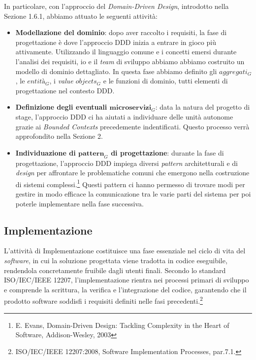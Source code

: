         \noindent In particolare, con l'approccio del \textit{Domain-Driven Design}, introdotto nella Sezione 1.6.1, abbiamo attuato le seguenti attività:
        \begin{itemize}
            \item \textbf{Modellazione del dominio}: dopo aver raccolto i requisiti, la fase di progettazione è dove l'approccio DDD inizia a entrare in gioco più attivamente. Utilizzando il linguaggio comune e i concetti emersi durante l'analisi dei requisiti, io e il \textit{team} di sviluppo abbiamo abbiamo costruito un modello di dominio dettagliato. In questa fase abbiamo definito gli $aggregati_G$, le $entità_G$, i \textit{value $objects_G$} e le funzioni di dominio, tutti elementi di progettazione nel contesto DDD. 
            \item \textbf{Definizione degli eventuali $\textbf{microservizi}_G$}: data la natura del progetto di stage, l'approccio DDD ci ha aiutati a individuare delle unità autonome grazie ai \textit{Bounded Contexts} precedemente indentificati. Questo processo verrà approfondito nella Sezione 2.
            \item \textbf{Individuazione di $\textbf{pattern}_G$ di progettazione}: durante la fase di progettazione, l’approccio DDD impiega diversi \textit{pattern} architetturali e di \textit{design} per affrontare le problematiche comuni che emergono nella costruzione di sistemi complessi.\footnote{E. Evans, Domain-Driven Design: Tackling Complexity in the Heart of Software, Addison-Wesley, 2003} Questi pattern ci hanno permesso di trovare modi per gestire in modo efficace la comunicazione tra le varie parti del sistema per poi poterle implementare nella fase successiva.
        \end{itemize}
        
        \subsection{Implementazione}
        
        L'attività di Implementazione costituisce una fase essenziale nel ciclo di vita del \textit{software}, in cui la soluzione progettata viene tradotta in codice eseguibile, rendendola concretamente fruibile dagli utenti finali. Secondo lo standard ISO/IEC/IEEE 12207, l'implementazione rientra nei processi primari di sviluppo e comprende la scrittura, la verifica e l'integrazione del codice, garantendo che il prodotto software soddisfi i requisiti definiti nelle fasi precedenti.\footnote{ISO/IEC/IEEE 12207:2008, Software Implementation Processes, par.7.1.} 

